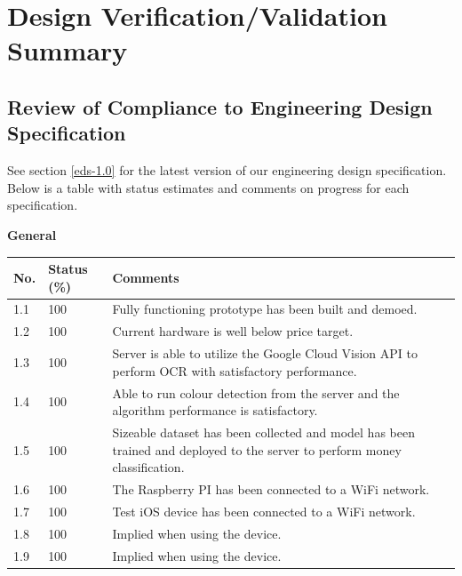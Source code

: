 \documentclass[a4paper,11pt]{article}
\begin{document}
\newpage

\section{Design Verification/Validation Summary}

\subsection{Review of Compliance to Engineering Design Specification}
See section \ref{eds-1.0} for the latest version of our engineering design specification. Below is a table with status estimates and comments on progress for each specification.

\textbf{General}
\begin{table}[ht]
    \centering
    \begin{tabular}{|p{0.7cm}|p{1cm}|p{12cm}|}
        \hline
        No. & Status (\%) & Comments \\ \hline
        
        1.1 & 100 & Fully functioning prototype has been built and demoed. \\ \hline
        
        1.2 & 100 & Current hardware is well below price target. \\ \hline
        
        1.3 & 100 & Server is able to utilize the Google Cloud Vision API to perform OCR with satisfactory performance. \\ \hline
        
        1.4 & 100 & Able to run colour detection from the server and the algorithm performance is satisfactory. \\ \hline
        
        1.5 & 100 & Sizeable dataset has been collected and model has been trained and deployed to the server to perform money classification. \\ \hline
        
        1.6 & 100 & The Raspberry PI has been connected to a WiFi network. \\ \hline
        
        1.7 & 100 & Test iOS device has been connected to a WiFi network. \\ \hline
        
        1.8 & 100 & Implied when using the device. \\ \hline
        
        1.9 & 100 & Implied when using the device. \\ \hline
    \end{tabular}
\end{table}
\end{document}
